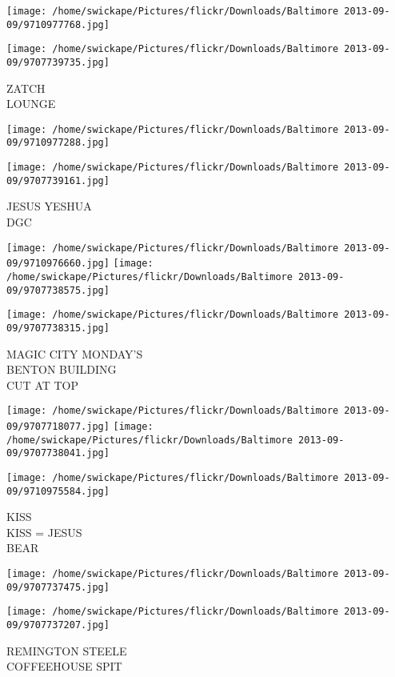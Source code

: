 \documentclass[10pt,letterpaper]{article}
\begin{document}
\texttt{[image: /home/swickape/Pictures/flickr/Downloads/Baltimore 2013-09-09/9710977768.jpg]}

\vspace{0.25in}
\texttt{[image: /home/swickape/Pictures/flickr/Downloads/Baltimore 2013-09-09/9707739735.jpg]}

ZATCH\\
LOUNGE
\pagebreak

\texttt{[image: /home/swickape/Pictures/flickr/Downloads/Baltimore 2013-09-09/9710977288.jpg]}

\vspace{0.25in}
\texttt{[image: /home/swickape/Pictures/flickr/Downloads/Baltimore 2013-09-09/9707739161.jpg]}

JESUS YESHUA\\
DGC
\pagebreak

\texttt{[image: /home/swickape/Pictures/flickr/Downloads/Baltimore 2013-09-09/9710976660.jpg]}
\texttt{[image: /home/swickape/Pictures/flickr/Downloads/Baltimore 2013-09-09/9707738575.jpg]}

\vspace{0.25in}
\texttt{[image: /home/swickape/Pictures/flickr/Downloads/Baltimore 2013-09-09/9707738315.jpg]}

MAGIC CITY MONDAY'S\\
BENTON BUILDING\\
CUT AT TOP
\pagebreak

\texttt{[image: /home/swickape/Pictures/flickr/Downloads/Baltimore 2013-09-09/9707718077.jpg]}
\texttt{[image: /home/swickape/Pictures/flickr/Downloads/Baltimore 2013-09-09/9707738041.jpg]}

\texttt{[image: /home/swickape/Pictures/flickr/Downloads/Baltimore 2013-09-09/9710975584.jpg]}

KISS\\
KISS = JESUS\\
BEAR
\pagebreak

\texttt{[image: /home/swickape/Pictures/flickr/Downloads/Baltimore 2013-09-09/9707737475.jpg]}

\vspace{0.25in}
\texttt{[image: /home/swickape/Pictures/flickr/Downloads/Baltimore 2013-09-09/9707737207.jpg]}

REMINGTON STEELE\\
COFFEEHOUSE SPIT
\pagebreak
\end{document}
